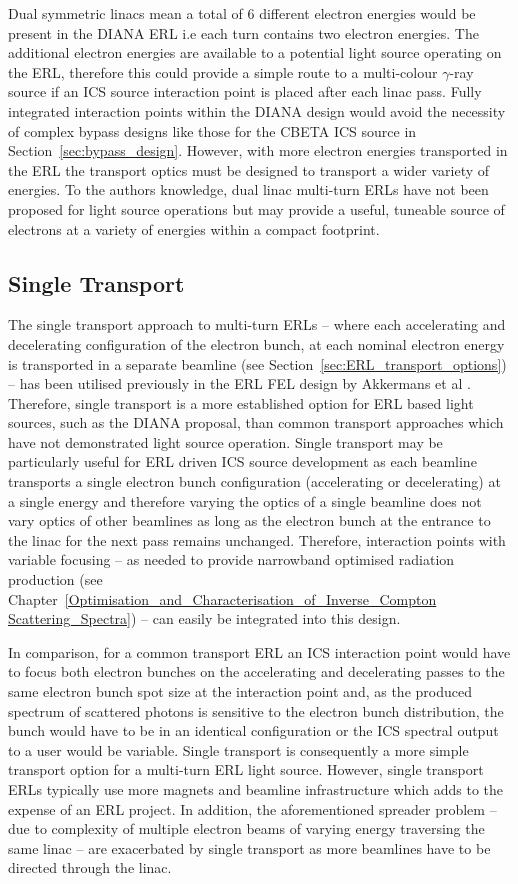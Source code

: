 \documentclass[../main.tex]{subfiles}
\begin{document}
Dual symmetric linacs mean a total of 6 different electron energies would be present in the DIANA ERL i.e each turn contains two electron energies. The additional electron energies are available to a potential light source operating on the ERL, therefore this could provide a simple route to a multi-colour $\gamma$-ray source if an ICS source interaction point is placed after each linac pass. Fully integrated interaction points within the DIANA design would avoid the necessity of complex bypass designs like those for the CBETA ICS source in Section~\ref{sec:bypass_design}. However, with more electron energies transported in the ERL the transport optics must be designed to transport a wider variety of energies. To the authors knowledge, dual linac multi-turn ERLs have not been proposed for light source operations but may provide a useful, tuneable source of electrons at a variety of energies within a compact footprint.

\subsection{Single Transport}

The single transport approach to multi-turn ERLs -- where each accelerating and decelerating configuration of the electron bunch, at each nominal electron energy is transported in a separate beamline (see Section~\ref{sec:ERL_transport_options}) -- has been utilised previously in the ERL FEL design by Akkermans et al \cite{akkermans2017compact}. Therefore, single transport is a more established option for ERL based light sources, such as the DIANA proposal, than common transport approaches which have not demonstrated light source operation. Single transport may be particularly useful for ERL driven ICS source development as each beamline transports a single electron bunch configuration (accelerating or decelerating) at a single energy and therefore varying the optics of a single beamline does not vary optics of other beamlines as long as the electron bunch at the entrance to the linac for the next pass remains unchanged. Therefore, interaction points with variable focusing -- as needed to provide narrowband optimised radiation production (see Chapter~\ref{Optimisation_and_Characterisation_of_Inverse_Compton Scattering_Spectra}) -- can easily be integrated into this design.

In comparison, for a common transport ERL an ICS interaction point would have to focus both electron bunches on the accelerating and decelerating passes to the same electron bunch spot size at the interaction point and, as the produced spectrum of scattered photons is sensitive to the electron bunch distribution, the bunch would have to be in an identical configuration or the ICS spectral output to a user would be variable. Single transport is consequently a more simple transport option for a multi-turn ERL light source. However, single transport ERLs typically use more magnets and beamline infrastructure which adds to the expense of an ERL project. In addition, the aforementioned spreader problem -- due to complexity of multiple electron beams of varying energy traversing the same linac -- are exacerbated by single transport as more beamlines have to be directed through the linac.  
\end{document}
